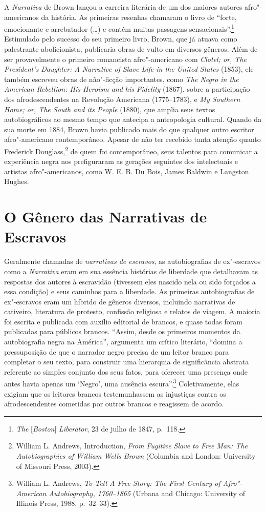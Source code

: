 A \emph{Narrativa} de Brown
lançou a carreira literária de um dos maiores autores afro"-americanos da
história. As primeiras resenhas chamaram o livro de ``forte, emocionante
e arrebatador (\ldots{}) e contém muitas passagens sensacionais''.\footnote{\emph{The} {[}\emph{Boston}{]} \emph{Liberator}, 23 de julho de 1847, p.~118.} Estimulado
pelo sucesso do seu primeiro livro, Brown, que já atuava como
palestrante abolicionista, publicaria obras de vulto em diversos
gêneros. Além de ser provavelmente o primeiro romancista afro"-americano
com \emph{Clotel; or, The President's Daughter: A Narrative of Slave
Life in the United States} (1853), ele também escreveu obras de
não"-ficção importantes, como \emph{The Negro in the American Rebellion:
His Heroism and his Fidelity} (1867), sobre a participação dos
afrodescendentes na Revolução Americana (1775--1783), e \emph{My Southern
Home; or, The South and its People} (1880), que amplia seus textos
autobiográficos ao mesmo tempo que antecipa a antropologia cultural.
Quando da sua morte em 1884, Brown havia publicado mais do que qualquer
outro escritor afro"-americano contemporâneo. Apesar de não ter recebido
tanta atenção quanto Frederick Douglass,\footnote{William L. Andrews,
  Introduction, \emph{From Fugitive Slave to Free Man: The
  Autobiographies of William Wells Brown} (Columbia and London:
  University of Missouri Press, 2003).} de quem foi contemporâneo, seus
talentos para comunicar a experiência negra nos  prefiguraram as
gerações seguintes dos intelectuais e artistas afro"-americanos, como W.
E. B. Du Bois, James Baldwin e Langston Hughes.

\section{O Gênero das Narrativas de Escravos}

Geralmente chamadas de \emph{narrativas de escravos}, as autobiografias
de ex"-escravos como a \emph{Narrativa} eram em sua essência histórias de
liberdade que detalhavam as respostas dos autores à escravidão (tivessem
eles nascido nela ou sido forçados a essa condição) e seus caminhos para
a liberdade. As primeiras autobiografias de ex"-escravos eram um híbrido
de gêneros diversos, incluindo narrativas de cativeiro, literatura de
protesto, confissão religiosa e relatos de viagem. A maioria foi escrita
e publicada com auxílio editorial de brancos, e quase todas foram
publicadas para públicos brancos. ``Assim, desde os primeiros momentos
da autobiografia negra na América'', argumenta um crítico literário,
``domina a pressuposição de que o narrador negro precisa de um leitor
branco para completar o seu texto, para construir uma hierarquia de
significância abstrata referente ao simples conjunto dos seus fatos,
para oferecer uma presença onde antes havia apenas um `Negro', uma
ausência escura''.\footnote{William L. Andrews, \emph{To Tell A Free
  Story: The First Century of Afro"-American Autobiography, 1760--1865}
  (Urbana and Chicago: University of Illinois Press, 1988, p.~32--33).}
Coletivamente, elas exigiam que os leitores brancos testemunhassem as
injustiças contra os afrodescendentes cometidas por outros brancos e
reagissem de acordo.

